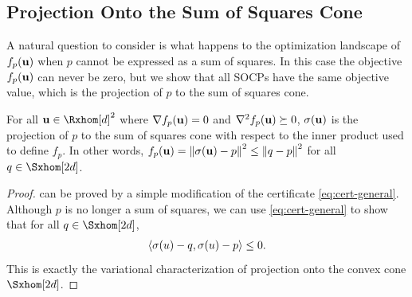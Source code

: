 \documentclass[final,onefignum,onetabnum]{siamart220329}
\begin{document}
\subsection{Projection Onto the Sum of Squares Cone}
A natural question to consider is what happens to the optimization landscape of
$f_p(\boldsymbol{\mathbf{u}})$ when $p$ cannot be expressed as a sum of squares. In this case
the objective $f_p(\boldsymbol{\mathbf{u}})$ can never be zero, but we show that all SOCPs have
the same objective value, which is the projection of $p$ to the sum of squares
cone.

\begin{corollary} \label{cor:projection} For all $\vecp{u} \in \Rxhom[d]^2$
  where $\nabla f_p(\boldsymbol{\mathbf{u}}) = 0$ and $\nabla^2 f_p (\boldsymbol{\mathbf{u}}) \succeq 0$,
  $\sigma(\boldsymbol{\mathbf{u}})$ is the projection of $p$ to the sum of squares cone with
  respect to the inner product used to define $f_p$. In other words,
  $f_p(\boldsymbol{\mathbf{u}}) = \left\lVert \sigma(\boldsymbol{\mathbf{u}})-p \right\lVert^2 \le \left\lVert q - p \right\lVert^2$ for all
  $q \in \Sxhom[2d]$.
\end{corollary}
\begin{proof}
   can be proved by a simple modification of the
  certificate \eqref{eq:cert-general}. Although $p$ is no longer a sum of
  squares, we can use \eqref{eq:cert-general} to show that for all
  $q \in \Sxhom[2d]$,
  \begin{align*}
    \left\langle \sigma(u) - q,\sigma(u) - p \right\rangle \le 0.
  \end{align*}
  This is exactly the variational characterization of projection onto the convex
  cone $\Sxhom[2d]$.
\end{proof}
\end{document}
